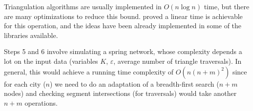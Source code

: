 \documentclass[a4paper,11pt]{article}
\begin{document}
Triangulation algorithms are usually implemented in $O(n
\log{n})$ time, but there are many optimizations to reduce this
bound.  proved a linear time is achievable for this
operation, and the ideas have been already implemented in some of the
libraries available.

Steps 5 and 6 involve simulating a spring network, whose complexity
depends a lot on the input data (variables $K$, $\varepsilon$, average
number of triangle traversals). In general, this would achieve a
running time complexity of $O(n(n+m)^2)$ since for each city ($n$) we
need to do an adaptation of a breadth-first search ($n+m$ nodes) and
checking segment intersections (for traversals) would take another
$n+m$ operations.

\FloatBarrier
\nocite{*}


\end{document}
